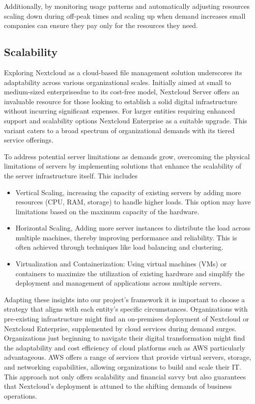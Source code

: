 \documentclass[12pt]{article}
\begin{document}
Additionally, by monitoring usage patterns and automatically adjusting resources scaling down during off-peak times and scaling up when demand increases small companies can ensure they pay only for the resources they need. 

\subsection{Scalability}

Exploring Nextcloud as a cloud-based file management solution underscores its adaptability across various organizational scales. Initially aimed at small to medium-sized enterprisesdue to its cost-free model, Nextcloud Server offers an invaluable resource for those looking to establish a solid digital infrastructure without incurring significant expenses. For larger entities requiring enhanced support and scalability options Nextcloud Enterprise as a suitable upgrade. This variant caters to a broad spectrum of organizational demands with its tiered service offerings.

To address potential server limitations as demands grow, overcoming the physical limitations of servers by implementing solutions that enhance the scalability of the server infrastructure itself. This includes
\begin{itemize}
    \item Vertical Scaling, increasing the capacity of existing servers by adding more resources (CPU, RAM, storage) to handle higher loads. This option may have limitations based on the maximum capacity of the hardware.
    \item Horizontal Scaling, Adding more server instances to distribute the load across multiple machines, thereby improving performance and reliability. This is often achieved through techniques like load balancing and clustering.
    \item Virtualization and Containerization: Using virtual machines (VMs) or containers to maximize the utilization of existing hardware and simplify the deployment and management of applications across multiple servers.
\end{itemize}

Adapting these insights into our project's framework it is important to choose a strategy that aligns with each entity's specific circumstances. Organizations with pre-existing infrastructure might find an on-premises deployment of Nextcloud or Nextcloud Enterprise, supplemented by cloud services during demand surges. Organizations just beginning to navigate their digital transformation might find the adaptability and cost efficiency of cloud platforms such as AWS particularly advantageous. AWS offers a range of services that provide virtual servers, storage, and networking capabilities, allowing organizations to build and scale their IT. This approach not only offers scalability and financial savvy but also guarantees that Nextcloud's deployment is attuned to the shifting demands of business operations. 
\end{document}
